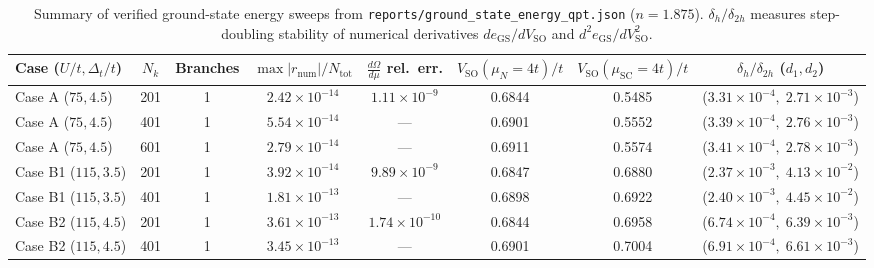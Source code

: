 \documentclass[aps,prb,twocolumn,superscriptaddress,longbibliography,floatfix]{revtex4-2}
\newcommand{\SO}{V_{\mathrm{SO}}}
\begin{document}
\begin{table}[t]
\centering
\caption{Summary of verified ground-state energy sweeps from \texttt{reports/ground\_state\_energy\_qpt.json} ($n=1.875$). $\delta_h/\delta_{2h}$ measures step-doubling stability of numerical derivatives $de_{\mathrm{GS}}/d\SO$ and $d^2e_{\mathrm{GS}}/d\SO^2$.}
\label{tab:gse_verification}
\footnotesize
\begin{tabular}{lccccccc}
\toprule
Case ($U/t,\Delta_t/t$) & $N_k$ & Branches & $\max|r_{\mathrm{num}}|/N_{\mathrm{tot}}$ & $\frac{d\Omega}{d\mu}$ rel.\ err. & $\SO(\mu_N=4t)/t$ & $\SO(\mu_{\mathrm{SC}}=4t)/t$ & $\delta_h/\delta_{2h}$ ($d_1, d_2$) \\
\midrule
Case A ($75, 4.5$)  & 201 & 1 & $2.42\times 10^{-14}$ & $1.11\times 10^{-9}$ & 0.6844 & 0.5485 & ($3.31\times 10^{-4},\; 2.71\times 10^{-3}$) \\
Case A ($75, 4.5$)  & 401 & 1 & $5.54\times 10^{-14}$ & ---                  & 0.6901 & 0.5552 & ($3.39\times 10^{-4},\; 2.76\times 10^{-3}$) \\
Case A ($75, 4.5$)  & 601 & 1 & $2.79\times 10^{-14}$ & ---                  & 0.6911 & 0.5574 & ($3.41\times 10^{-4},\; 2.78\times 10^{-3}$) \\
Case B1 ($115, 3.5$)& 201 & 1 & $3.92\times 10^{-14}$ & $9.89\times 10^{-9}$ & 0.6847 & 0.6880 & ($2.37\times 10^{-3},\; 4.13\times 10^{-2}$) \\
Case B1 ($115, 3.5$)& 401 & 1 & $1.81\times 10^{-13}$ & ---                  & 0.6898 & 0.6922 & ($2.40\times 10^{-3},\; 4.45\times 10^{-2}$) \\
Case B2 ($115, 4.5$)& 201 & 1 & $3.61\times 10^{-13}$ & $1.74\times 10^{-10}$ & 0.6844 & 0.6958 & ($6.74\times 10^{-4},\; 6.39\times 10^{-3}$) \\
Case B2 ($115, 4.5$)& 401 & 1 & $3.45\times 10^{-13}$ & ---                  & 0.6901 & 0.7004 & ($6.91\times 10^{-4},\; 6.61\times 10^{-3}$) \\
\bottomrule
\end{tabular}
\end{table}
\end{document}

